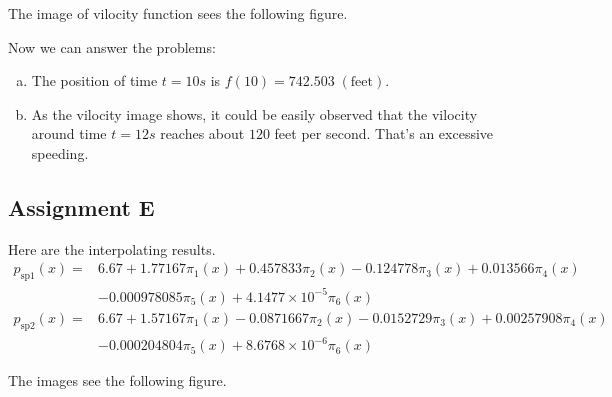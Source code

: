 \documentclass[11pt,en]{elegantpaper}
\begin{document}
The image of vilocity function sees the following figure.

\begin{center}
\end{center}

Now we can answer the problems:

\begin{enumerate}[(a)]
  \item The position of time $t=10s$ is $f(10)=742.503\;(\text{feet})$.
  \item As the vilocity image shows, it could be easily observed that the vilocity around time $t=12s$ reaches about $120$ feet per second. That's an excessive speeding.
\end{enumerate}

\subsection{Assignment E}

Here are the interpolating results.
\begin{align*}
  p_\text{sp1}(x) =& 6.67+1.77167\pi_{1}(x)+0.457833\pi_{2}(x)-0.124778\pi_{3}(x)+0.013566\pi_{4}(x)\\
                   & -0.000978085\pi_{5}(x)+4.1477\times 10^{-5}\pi_{6}(x)\\
  p_\text{sp2}(x) =& 6.67+1.57167\pi_{1}(x)-0.0871667\pi_{2}(x)-0.0152729\pi_{3}(x)+0.00257908\pi_{4}(x)\\
                   & -0.000204804\pi_{5}(x)+8.6768\times 10^{-6}\pi_{6}(x)
\end{align*}

The images see the following figure.
\end{document}
